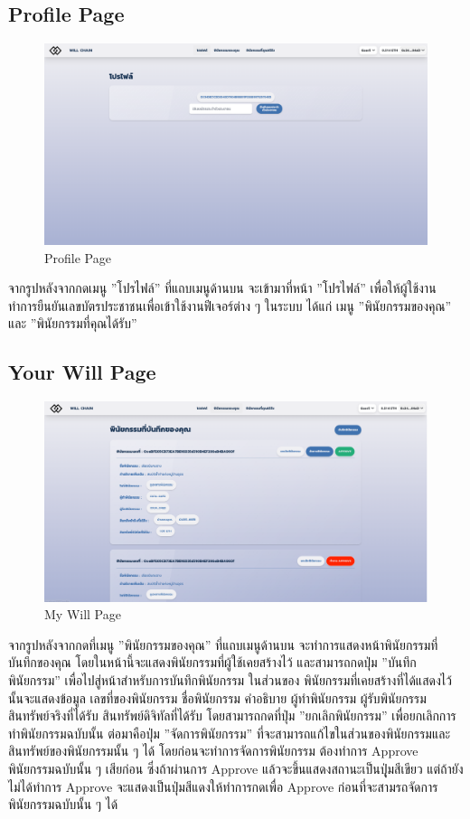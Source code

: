 \documentclass[12pt,oneside,openright,a4paper]{cpe-thai-project}
\begin{document}
\subsection{Profile Page}
	\begin{figure}[!thb]
			\centering
			\includegraphics[scale=0.2]{Profile4}
			\caption{Profile Page}
		\end{figure}
		\FloatBarrier
\tab จากรูปหลังจากกดเมนู ''โปรไฟล์'' ที่แถบเมนูด้านบน จะเข้ามาที่หน้า ''โปรไฟล์'' เพื่อให้ผู้ใช้งานทำการยืนยันเลขบัตรประชาชนเพื่อเข้าใช้งานฟีเจอร์ต่าง ๆ ในระบบ ได้แก่ เมนู ''พินัยกรรมของคุณ'' และ ''พินัยกรรมที่คุณได้รับ''
\subsection{Your Will Page }
	\begin{figure}[!thb]
			\centering
			\includegraphics[scale=0.2]{myWill4}
			\caption{My Will Page}
		\end{figure}
		\FloatBarrier
\tab จากรูปหลังจากกดที่เมนู ''พินัยกรรมของคุณ'' ที่แถบเมนูด้านบน จะทำการแสดงหน้าพินัยกรรมที่บันทึกของคุณ โดยในหน้านี้จะแสดงพินัยกรรมที่ผู้ใช้เคยสร้างไว้ และสามารถกดปุ่ม ''บันทึกพินัยกรรม'' เพื่อไปสู่หน้าสำหรับการบันทึกพินัยกรรม ในส่วนของ
พินัยกรรมที่เคยสร้างที่ได้แสดงไว้นั้นจะแสดงข้อมูล เลขที่ของพินัยกรรม ชื่อพินัยกรรม คำอธิบาย ผู้ทำพินัยกรรม ผู้รับพินัยกรรม สินทรัพย์จริงที่ได้รับ สินทรัพย์ดิจิทัลที่ได้รับ โดยสามารถกดที่ปุ่ม ''ยกเลิกพินัยกรรม'' เพื่อยกเลิกการทำพินัยกรรมฉบับนั้น ต่อมาคือปุ่ม ''จัดการพินัยกรรม'' ที่จะสามารถแก้ไขในส่วนของพินัยกรรมและสินทรัพย์ของพินัยกรรมนั้น ๆ ได้ โดยก่อนจะทำการจัดการพินัยกรรม ต้องทำการ Approve พินัยกรรมฉบับนั้น ๆ เสียก่อน ซึ่งถ้าผ่านการ Approve แล้วจะขึ้นแสดงสถานะเป็นปุุ่มสีเขียว แต่ถ้ายังไม่ได้ทำการ Approve จะแสดงเป็นปุ่มสีแดงให้ทำการกดเพื่อ Approve ก่อนที่จะสามรถจัดการพินัยกรรมฉบับนั้น ๆ  ได้
\end{document}
